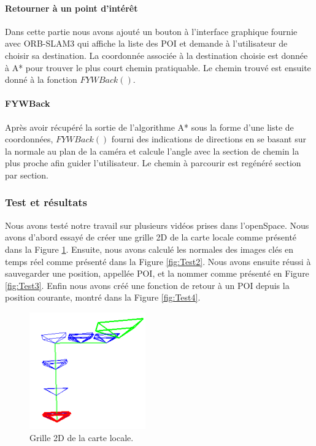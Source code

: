 \documentclass[11pt]{article}
\begin{document}
        \paragraph{Retourner à un point d'intérêt}
          Dans cette partie nous avons ajouté un bouton à l'interface graphique fournie avec ORB-SLAM3 qui affiche la liste des POI et 
          demande à l'utilisateur de choisir sa destination. La coordonnée associée à la destination choisie est donnée à A* pour trouver
          le plus court chemin pratiquable. Le chemin trouvé est ensuite donné à la fonction $FYWBack()$.          

        \paragraph{FYWBack}
            Après avoir récupéré la sortie de l'algorithme A* sous la forme d'une liste de coordonnées, $FYWBack()$ fourni des indications
            de directions en se basant sur la normale au plan de la caméra et calcule l'angle avec la section de chemin la plus proche
            afin guider l'utilisateur. Le chemin à parcourir est regénéré section par section.            
      
      \subsubsection{Test et résultats}
        Nous avons testé notre travail sur plusieurs vidéos prises dans l'openSpace. Nous avons d'abord essayé de créer une grille 2D de la 
        carte locale comme présenté dans la Figure \ref{fig:Test1}. Ensuite, nous avons calculé les normales des images clés en temps réel 
        comme présenté dans la Figure \ref{fig:Test2}. Nous avons ensuite réussi à sauvegarder une position, appellée POI, et la nommer comme
        présenté en Figure \ref{fig:Test3}. Enfin nous avons créé une fonction de retour à un POI depuis la position courante, montré dans la 
        Figure \ref{fig:Test4}.

        \begin{figure}[hbt]  
          \centering
          \includegraphics[width=50mm]{Test1.png}    
          \caption{Grille 2D de la carte locale.}
          \label{fig:Test1}
        \end{figure} 
\end{document}
